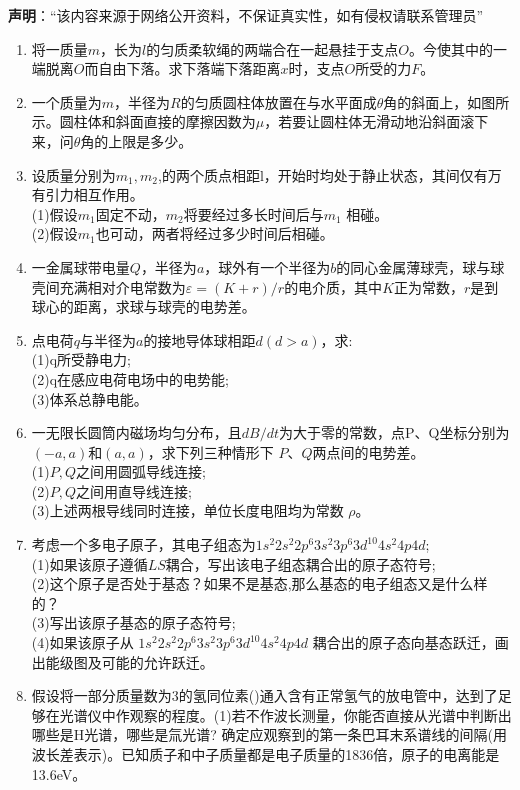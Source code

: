 

\textbf{声明}：“该内容来源于网络公开资料，不保证真实性，如有侵权请联系管理员”

\begin{enumerate}
\item 将一质量$m$，长为$l$的匀质柔软绳的两端合在一起悬挂于支点$O$。今使其中的一端脱离$O$而自由下落。求下落端下落距离$x$时，支点$O$所受的力$F$。
\item 一个质量为$m$，半径为$R$的匀质圆柱体放置在与水平面成$\theta$角的斜面上，如图所示。圆柱体和斜面直接的摩擦因数为$\mu$，若要让圆柱体无滑动地沿斜面滚下来，问$\theta$角的上限是多少。
\item 设质量分别为$m_1,m_2$,的两个质点相距l，开始时均处于静止状态，其间仅有万有引力相互作用。\\
(1)假设$m_1$固定不动，$m_2$将要经过多长时间后与$m_1$ 相碰。\\
(2)假设$m_1$也可动，两者将经过多少时间后相碰。
\item 一金属球带电量$Q$，半径为$a$，球外有一个半径为$b$的同心金属薄球壳，球与球壳间充满相对介电常数为$\varepsilon=(K+r)/r$的电介质，其中$K$正为常数，$r$是到球心的距离，求球与球壳的电势差。
\item 点电荷$q$与半径为$a$的接地导体球相距$d(d>a)$，求:\\
(1)q所受静电力;\\
(2)q在感应电荷电场中的电势能;\\
(3)体系总静电能。
\item 一无限长圆筒内磁场均匀分布，且$dB/dt$为大于零的常数，点P、Q坐标分别为$(-a,a)$和$(a,a)$，求下列三种情形下 $P$、$Q$两点间的电势差。\\
(1)$P,Q$之间用圆弧导线连接;\\
(2)$P,Q$之间用直导线连接;\\
(3)上述两根导线同时连接，单位长度电阻均为常数 $\rho$。
\item 考虑一个多电子原子，其电子组态为$1s^2 2s^2 2p^6 3s^2 3p^6 3d^{10}4s^2 4p4d$;\\
(1)如果该原子遵循$LS$耦合，写出该电子组态耦合出的原子态符号;\\
(2)这个原子是否处于基态？如果不是基态,那么基态的电子组态又是什么样的？\\
(3)写出该原子基态的原子态符号;\\
(4)如果该原子从 $1s^2 2s^2 2p^6 3s^2 3p^6 3d^{10}4s^2 4p4d$ 耦合出的原子态向基态跃迁，画出能级图及可能的允许跃迁。
\item 假设将一部分质量数为3的氢同位素()通入含有正常氢气的放电管中，达到了足够在光谱仪中作观察的程度。(1)若不作波长测量，你能否直接从光谱中判断出哪些是H光谱，哪些是氚光谱?
确定应观察到的第一条巴耳末系谱线的间隔(用波长差表示)。已知质子和中子质量都是电子质量的1836倍，原子的电离能是13.6eV。
\end{enumerate}
